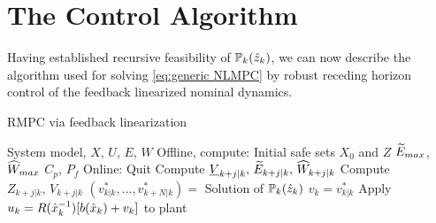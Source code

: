 \section{The Control Algorithm}

Having established recursive feasibility of $\mathbb{P}_{k}(\hat{z}_{k})$, we can now describe the algorithm used for solving \eqref{eq:generic NLMPC} by robust receding horizon control of the feedback linearized nominal dynamics.
%

\begin{algorithm}
	\caption{RMPC via feedback linearization}
\begin{algorithmic}
	\Require System model, $X$, $U$, $E$, $W$ 
	\State	Offline, compute:
	\State \quad Initial safe sets $X_0$ and $Z$ 
	\State \quad $\widetilde{E}_{max}$, $\widehat{W}_{max}$ 
	\State \quad $C_p$, $P_f$ 
	\State Online: 
	\State Quit
	\Else
	\State Compute $\underline{V}_{k+j|k},\,\widetilde{E}_{k+j|k},\, \widehat{W}_{k+j|k}$ 
	\State Compute $Z_{k+j|k},\,V_{k+j|k}$ 
	\State $(v^*_{k|k}, \ldots, v^*_{k+N|k}) = $ Solution of $\mathbb{P}_{k}(\hat{z}_{k})$ 
	\State $v_k = v^{*}_{k|k}$
	\State Apply $u_k = R(\hat{x}_{k}^{-1})[b(\hat{x}_{k})+v_k]$ to plant 
	\EndFor	
	\EndIf		
\end{algorithmic}
\label{alg:RMPC}
\end{algorithm}

